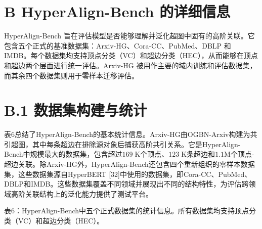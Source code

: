 \documentclass[10pt]{article}
\begin{document}
\section*{B HyperAlign-Bench 的详细信息}

HyperAlign-Bench 旨在评估模型是否能够理解并泛化超图中固有的高阶关联。它包含五个正式的基准数据集：Arxiv-HG、Cora-CC、PubMed、DBLP 和 IMDB。每个数据集均支持顶点分类（VC）和超边分类（HEC），从而能够在顶点和超边两个层面进行统一评估。Arxiv-HG 被用作主要的域内训练和评估数据集，而其余四个数据集则用于零样本迁移评估。

\section*{B.1 数据集构建与统计}

表6总结了HyperAlign-Bench的基本统计信息。Arxiv-HG由OGBN-Arxiv构建为共引超图，其中每条超边在排除源对象后捕获高阶共引关系。它是HyperAlign-Bench中规模最大的数据集，包含超过\({169}\mathrm{\;K}\)个顶点、\({123}\mathrm{\;K}\)条超边和\({1.1}\mathrm{M}\)个顶点-超边关联。除Arxiv-HG外，HyperAlign-Bench还包含四个重新组织的零样本数据集，这些数据集源自HyperBERT [32]中使用的数据集，即Cora-CC、PubMed、DBLP和IMDB。这些数据集覆盖不同领域并展现出不同的结构特性，为评估跨领域高阶关联结构上的泛化能力提供了测试平台。

表6：HyperAlign-Bench中五个正式数据集的统计信息。所有数据集均支持顶点分类（VC）和超边分类（HEC）。

\begin{center}
\end{center}
\end{document}

